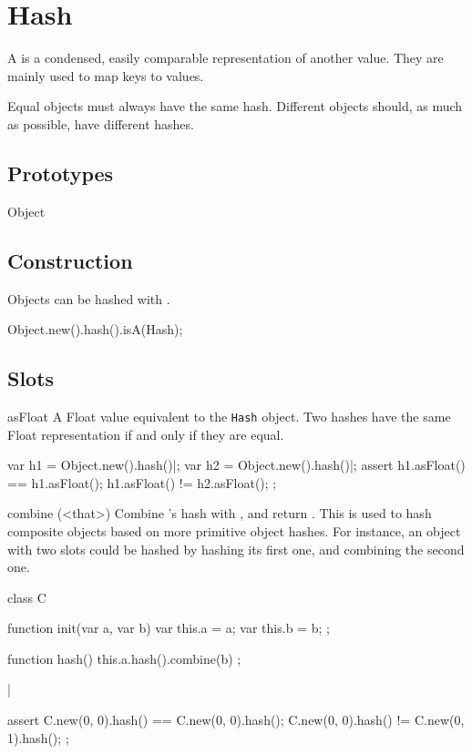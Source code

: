 
\section{Hash}

A  is a condensed, easily comparable representation of another
value. They are mainly used to map  keys to values.

Equal objects must always have the same hash. Different objects should, as
much as possible, have different hashes.

\subsection{Prototypes}
\begin{refObjects}
\item[Object]
\end{refObjects}

\subsection{Construction}
Objects can be hashed with .
\begin{urbiassert}
Object.new().hash().isA(Hash);
\end{urbiassert}

\subsection{Slots}
\begin{urbiscriptapi}
\item[asFloat] A Float value equivalent to the \lstinline|Hash| object. Two
  hashes have the same Float representation if and only if they are equal.
\begin{urbiscript}
var h1 = Object.new().hash()|;
var h2 = Object.new().hash()|;
assert
{
  h1.asFloat() == h1.asFloat();
  h1.asFloat() != h2.asFloat();
};
\end{urbiscript}


\item[combine](<that>)%
  Combine \that's hash with \this, and return \this. This is used to hash
  composite objects based on more primitive object hashes. For instance, an
  object with two slots could be hashed by hashing its first one, and
  combining the second one.

\begin{urbiscript}
class C
{
  function init(var a, var b)
  {
    var this.a = a;
    var this.b = b;
  };

  function hash()
  {
    this.a.hash().combine(b)
  };
}|

assert
{
  C.new(0, 0).hash() == C.new(0, 0).hash();
  C.new(0, 0).hash() != C.new(0, 1).hash();
};
\end{urbiscript}
\end{urbiscriptapi}


